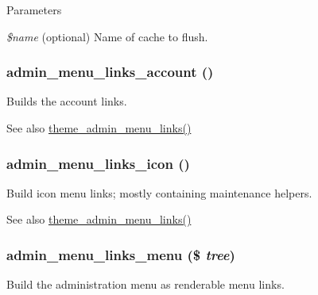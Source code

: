 \begin{DoxyParams}{Parameters}
\item[{\em \$name}](optional) Name of cache to flush. \end{DoxyParams}
\hypertarget{admin__menu_8inc_a532d8549ee18014ea986a2859b0210dc}{
\subsubsection[{admin\_\-menu\_\-links\_\-account}]{\setlength{\rightskip}{0pt plus 5cm}admin\_\-menu\_\-links\_\-account ()}}
\label{admin__menu_8inc_a532d8549ee18014ea986a2859b0210dc}
Builds the account links.

\begin{DoxySeeAlso}{See also}
\hyperlink{admin__menu_8module_a33d1120bbd0ebf32f21f44c17b831475}{theme\_\-admin\_\-menu\_\-links()} 
\end{DoxySeeAlso}
\hypertarget{admin__menu_8inc_abb0305b57b5e84d5bb49059d16e55aa0}{
\subsubsection[{admin\_\-menu\_\-links\_\-icon}]{\setlength{\rightskip}{0pt plus 5cm}admin\_\-menu\_\-links\_\-icon ()}}
\label{admin__menu_8inc_abb0305b57b5e84d5bb49059d16e55aa0}
Build icon menu links; mostly containing maintenance helpers.

\begin{DoxySeeAlso}{See also}
\hyperlink{admin__menu_8module_a33d1120bbd0ebf32f21f44c17b831475}{theme\_\-admin\_\-menu\_\-links()} 
\end{DoxySeeAlso}
\hypertarget{admin__menu_8inc_afbb93090bb402d1d524e666d370ffec5}{
\subsubsection[{admin\_\-menu\_\-links\_\-menu}]{\setlength{\rightskip}{0pt plus 5cm}admin\_\-menu\_\-links\_\-menu (\$ {\em tree})}}
\label{admin__menu_8inc_afbb93090bb402d1d524e666d370ffec5}
Build the administration menu as renderable menu links.


